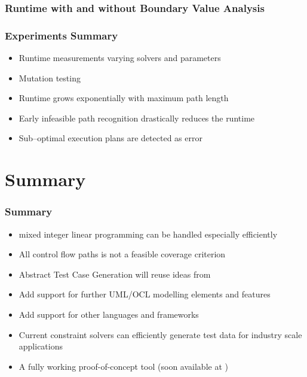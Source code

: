 \documentclass{beamer}
\begin{document}
\begin{frame}
\frametitle{Runtime with and without Boundary Value Analysis}
%
\end{frame}
\begin{frame}
\frametitle{Experiments Summary}
\begin{itemize}
  \item Runtime measurements varying solvers and parameters
  \item Mutation testing
  \item Runtime grows exponentially with maximum path length
  \item Early infeasible path recognition drastically reduces the runtime
  \item Sub--optimal execution plans are detected as error
\end{itemize}
\end{frame}

\section{Summary}
\begin{frame}
\frametitle{Summary}
\begin{itemize}
  \item mixed integer linear programming can be handled especially efficiently
  \item All control flow paths is not a feasible coverage criterion
  \vspace{0.2cm}
  \item Abstract Test Case Generation will reuse ideas from \cite{ParTeG}
  \item Add support for further UML/OCL modelling elements and features
  \item Add support for other languages and frameworks
  \vspace{0.2cm}
  \item Current constraint solvers can efficiently generate test data for industry scale applications
  \item A fully working proof-of-concept tool (soon available at \cite{PartegWebsite})
\end{itemize}
\end{frame}
\end{document}
